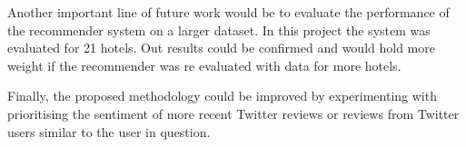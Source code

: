 Another important line of future work would be to evaluate the performance of the recommender system on a larger dataset. In this project the system was evaluated for 21 hotels. Out results could be confirmed and would hold more weight if the recommender was re evaluated with data for more hotels.

Finally, the proposed methodology could be improved by experimenting with prioritising the sentiment of more recent Twitter reviews or reviews from Twitter users similar to the user in question.
